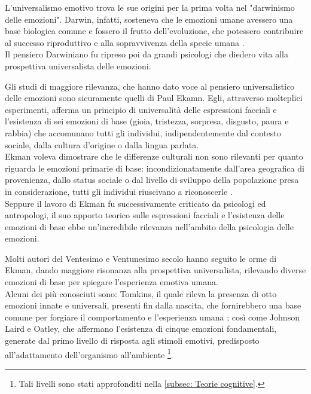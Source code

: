 L'universalismo emotivo trova le sue origini per la prima volta nel  "darwinismo delle emozioni". Darwin, infatti, sosteneva che le emozioni umane avessero una base biologica comune e fossero il frutto dell'evoluzione, che potessero contribuire al successo riproduttivo e alla sopravvivenza della specie umana \parencite{darwin}.\\
Il pensiero Darwiniano fu ripreso poi da grandi psicologi che diedero vita alla prospettiva universalista delle emozioni. 

Gli studi di maggiore rilevanza, che hanno dato voce al pensiero universalistico delle emozioni sono sicuramente quelli di Paul Ekamn. Egli, attraverso molteplici esperimenti, afferma un principio di universalità delle espressioni facciali e l'esistenza di sei emozioni di base (gioia, tristezza, sorpresa, disgusto, paura e rabbia) che accomunano tutti gli individui, indipendentemente dal contesto sociale, dalla cultura d'origine o dalla lingua parlata.\\ Ekman voleva dimostrare che le differenze culturali non sono rilevanti per quanto riguarda le emozioni primarie di base: incondizionatamente dall'area geografica di provenienza, dallo status sociale o dal livello di sviluppo della popolazione presa in considerazione, tutti gli individui riuscivano a riconoscerle \parencite{ekman}.\\
Seppure il lavoro di Ekman fu successivamente  criticato da psicologi ed antropologi, il suo apporto teorico sulle espressioni facciali e l'esistenza delle emozioni di base ebbe un'incredibile rilevanza nell'ambito della psicologia delle emozioni. 

Molti autori del Ventesimo e Ventunesimo secolo hanno seguito le orme di Ekman, dando maggiore risonanza alla prospettiva universalista, rilevando diverse emozioni di base per spiegare l'esperienza emotiva umana.\\
Alcuni dei più conosciuti sono: Tomkins, il quale rileva la presenza di otto emozioni innate e universali, presenti fin dalla nascita, che fornirebbero una base comune per forgiare il comportamento e l'esperienza umana \parencite{tomkins}; così come Johnson Laird e Oatley, che affermano l'esistenza di cinque emozioni fondamentali, generate dal primo livello di risposta agli stimoli emotivi, predisposto all'adattamento dell'organismo all'ambiente \parencite{Keith_JohnsonLaird} \footnote{Tali livelli sono stati approfonditi nella \autoref{subsec: Teorie cognitive}.}.

